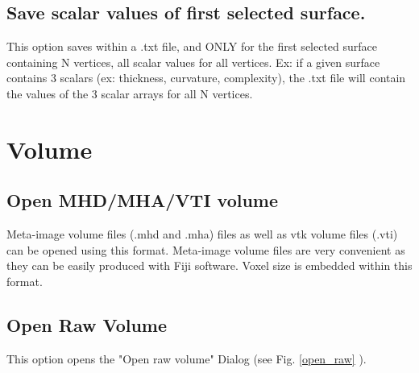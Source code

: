 \subsection{Save scalar values of first selected surface.}
This option saves within a .txt file, and ONLY for the first selected surface containing N vertices, all scalar values for all vertices. Ex: if a given surface contains 3 scalars (ex: thickness, curvature, complexity), the .txt file will contain the values of the 3 scalar arrays for all N vertices. 


\section{Volume}



\subsection{Open MHD/MHA/VTI volume}
Meta-image volume files (.mhd and .mha) files as well as vtk volume files (.vti) can be opened using this format. Meta-image volume files are very convenient as they can be easily produced with Fiji software. Voxel size is embedded within this format. 

\noindent

\subsection{Open Raw Volume}
This option opens the "Open raw volume" Dialog (see Fig. \ref{open_raw} \pageref{open_raw}).

